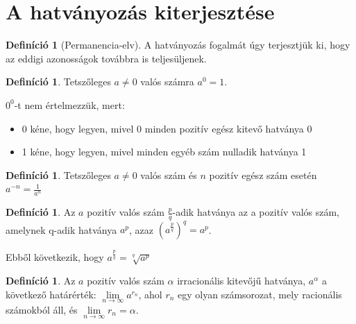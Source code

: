 \documentclass[twoside,12pt]{report}
\theoremstyle{definition}
\newtheorem{definition}[theorem]{Definíció}
\begin{document}
\section{A hatványozás kiterjesztése}
	\begin{definition}[Permanencia-elv]
		A hatványozás fogalmát úgy terjesztjük ki, hogy az eddigi azonosságok továbbra is teljesüljenek.
	\end{definition}
	\begin{definition}
		Tetszőleges $a\ne0$ valós számra $a^0=1$.
	\end{definition}
	$0^0$-t nem értelmezzük, mert:
	\begin{itemize}
		\item 0 kéne, hogy legyen, mivel 0 minden pozitív egész kitevő hatványa 0
		\item 1 kéne, hogy legyen, mivel minden egyéb szám nulladik hatványa 1
	\end{itemize}
	\begin{definition}
		Tetszőleges $a\ne0$ valós szám és $n$ pozitív egész szám esetén $a^{-n}=\frac{1}{a^n}$
	\end{definition}
	\begin{definition}
		Az $a$ pozitív valós szám $\frac{p}{q}$-adik hatványa az a pozitív valós szám, amelynek q-adik hatványa $a^p$, azaz $\left(a^{\frac{p}{q}}\right)^q=a^p$.
	\end{definition}
	Ebből következik, hogy $a^\frac{p}{q}=\sqrt[q]{a^p}$
	\begin{definition}
		Az $a$ pozitív valós szám $\alpha$ irracionális kitevőjű hatványa, $a^\alpha$ a következő határérték: $\lim\limits_{n\rightarrow\infty} a^{r_n}$, ahol {$r_n$} egy olyan számsorozat, mely racionális számokból áll, és $\lim\limits_{n\rightarrow\infty}r_n=\alpha$.
	\end{definition}
\end{document}
